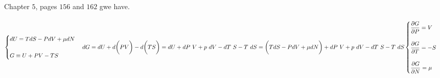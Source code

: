 \documentclass[fleqn]{article}
\begin{document}
\begin{enumerate}
      \textcolor{hwColor}{
        \\
        Chapter $5$, pages $156$ and $162$ gwe have. 
        \\
        \\
        $
          \begin{cases}
            dU=TdS-P dV+\mu dN
            \\
            \\
            G \equiv U+PV-TS
          \end{cases}
          \\
          \\
          \\
          dG=dU+d \bigg( PV \bigg)-d \bigg( TS \bigg)
          =dU+dP ~ V+p ~ dV-dT ~ S-T ~ dS
          \\
          \\
          \\
          =\bigg( TdS-P dV+\mu dN \bigg)+dP ~ V+p ~ dV-dT ~ S-T ~ dS
          \\
          \\
          \\
          \begin{cases}
            \dfrac{\partial G}{\partial P}=V
            \\
            \\
            \dfrac{\partial G}{\partial T}=-S
            \\
            \\
            \dfrac{\partial G}{\partial N}=\mu
          \end{cases}
        $
      }

  \end{enumerate}
\end{document}
